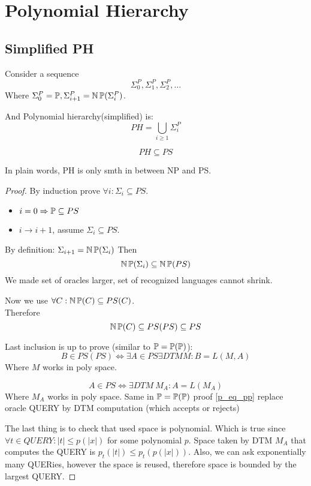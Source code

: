 \section{\texorpdfstring{Polynomial Hierarchy}{Polynomial Hierarchy}}
\vspace{5mm}
\large

\subsection{Simplified PH}

\begin{definition}[Simplified PH]
	Consider a sequence
	\[ \Sigma_0^P, \Sigma_1^P, \Sigma_2^P, \ldots \]
	Where $\Sigma_0^P = \operatorname{\mathbb{P}}, \Sigma_{i + 1}^P = \operatorname{\operatorname{\mathbb{N}}\mathbb{P}}(\Sigma_i^P)$.

	And Polynomial hierarchy(simplified) is:
	\[ PH = \bigcup_{i \geq 1} \Sigma_i^P \]
\end{definition}

\begin{theorem}
	\[ PH \subseteq PS \]

	In plain words, PH is only smth in between NP and PS.
\end{theorem}
\begin{proof}
	By induction prove $\forall i: \Sigma_i \subseteq PS$.

	\begin{itemize}
		\item $i = 0 \Rightarrow \operatorname{\mathbb{P}} \subseteq PS$
		\item $i \to i + 1$, assume $\Sigma_i \subseteq PS$.
	\end{itemize}

	By definition: $\Sigma_{i + 1} = \operatorname{\operatorname{\mathbb{N}}\mathbb{P}}(\Sigma_i)$
	Then
	\[ \operatorname{\operatorname{\mathbb{N}}\mathbb{P}}(\Sigma_i) \subseteq \operatorname{\operatorname{\mathbb{N}}\mathbb{P}}(PS) \]
	We made set of oracles larger, set of recognized languages cannot shrink.

	Now we use $\forall C: \operatorname{\operatorname{\mathbb{N}}\mathbb{P}}(C) \subseteq PS(C)$.\\
	Therefore
	\[ \operatorname{\operatorname{\mathbb{N}}\mathbb{P}}(C) \subseteq PS(PS) \subseteq PS \]

	Last inclusion is up to prove (similar to $\operatorname{\mathbb{P}} = \operatorname{\mathbb{P}}(\operatorname{\mathbb{P}})$):\\
	\[ B \in PS(PS) \iff \exists A \in PS \exists DTM M: B = L(M, A) \]
	Where $M$ works in poly space.

	\[ A \in PS \iff \exists DTM \ M_A: A = L(M_A) \]
	Where $M_A$ works in poly space.
	Same in $\operatorname{\mathbb{P}} = \operatorname{\mathbb{P}}(\operatorname{\mathbb{P}})$ proof \cref{p_eq_pp} replace oracle QUERY by DTM computation (which accepts or rejects)

	The last thing is to check that used space is polynomial.
	Which is true since $\forall t \in QUERY: |t| \leq p(|x|)$ for some polynomial $p$.
	Space taken by DTM $M_A$ that computes the QUERY is $p_t(|t|) \leq p_t(p(|x|))$.
	Also, we can ask exponentially many QUERies, however the space is reused, therefore space is bounded by the largest QUERY.
\end{proof}

